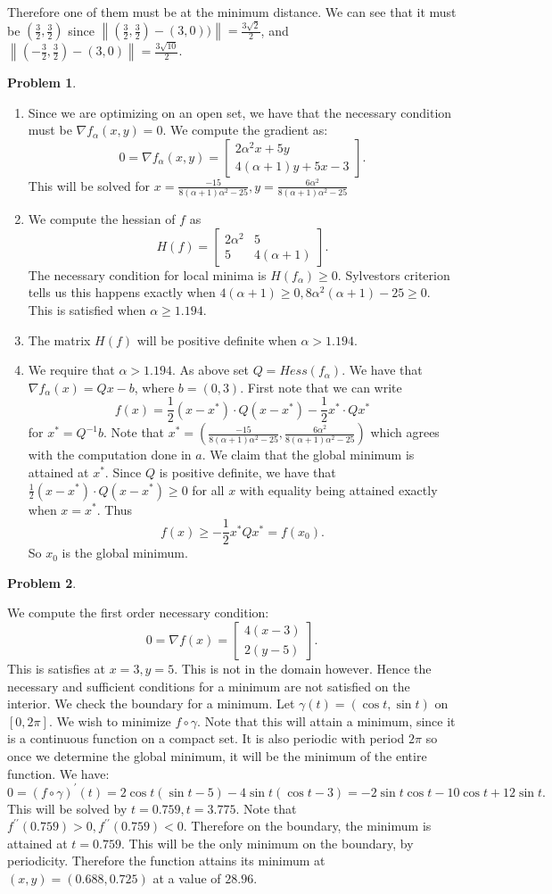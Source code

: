 \documentclass[12pt, a4paper]{article}
\newtheorem{problem}{Problem}
\theoremstyle{definition}
\newcommand{\penum}{ \begin{enumerate}[label=\bf(\alph*), leftmargin=0pt]}
\newcommand{\epenum}{ \end{enumerate} }
\newcommand{\grad}{\nabla}
\newcommand{\norm}[1]{\left\lVert#1\right\rVert}
\newcommand{\bmat}[1]{\begin{bmatrix}#1\end{bmatrix}}
\begin{document}
Therefore one of them must be at the minimum distance. We can see that it must be $(\frac{3}{2}, \frac{3}{2})$ since $\norm{(\frac{3}{2}, \frac{3}{2} )- (3,0))} = \frac{3\sqrt{2}}{2}$, and $\norm{(-\frac{3}{2}, \frac{3}{2}) - (3,0)} = \frac{3\sqrt{10}}{2}$. 
\newpage
\begin{problem}
\end{problem}
\penum 
\item Since we are optimizing on an open set, we have that the necessary condition must be $\grad f_\alpha(x,y) = 0$. We compute the gradient as: 
$$0 = \grad f_\alpha (x,y) = \bmat{2\alpha^2 x + 5y \\ 4(\alpha+1) y +5x -3}.$$
This will be solved for $x= \frac{-15}{8(\alpha+1)\alpha^2 -  25}, y= \frac{6\alpha^2}{8(\alpha+1)\alpha^2 - 25}$
\item We compute the hessian of $f$ as 
$$H(f) = \bmat{2\alpha^2 & 5 \\ 5 & 4(\alpha +1)}.$$
The necessary condition for local minima is $H(f_\alpha)\geq 0$. Sylvestors criterion tells us this happens exactly when $4(\alpha+1)\geq 0, 8\alpha^2(\alpha+1) - 25 \geq0$. This is satisfied when $\alpha \geq 1.194$. 
\item The matrix $H(f)$ will be positive definite when $\alpha> 1.194$. 
\item We require that $\alpha > 1.194$. As above set $Q = Hess(f_\alpha)$. We have that $\grad f_\alpha(x)  = Qx - b$, where $ b = (0,3)$. First note that we can write $$f(x) = \frac{1}{2} (x- x^\ast) \cdot Q (x-x^\ast) - \frac{1}{2} x^\ast \cdot Q x^\ast$$
for $x^\ast = Q^{-1}b$. Note that $x^\ast =( \frac{-15}{8(\alpha+1)\alpha^2 -  25},  \frac{6\alpha^2}{8(\alpha+1)\alpha^2 - 25} )$ which agrees with the computation done in $a$. We claim that the global minimum is attained at $x^\ast$. Since $Q$ is positive definite, we have that $\frac{1}{2} (x- x^\ast) \cdot Q (x-x^\ast) \geq 0$ for all $x$ with equality being attained exactly when $x = x^\ast$. Thus $$f(x) \geq - \frac{1}{2} x^\ast Q x^\ast = f(x_0). $$ So $x_0$ is the global minimum.
\epenum
\newpage
\begin{problem}
\end{problem}
We compute the first order necessary condition: 
$$0= \grad f(x) = \bmat{4(x-3) \\ 2(y-5)}.$$
This is satisfies at $x = 3,y=5$. This is not in the domain however. Hence the necessary and sufficient conditions for a minimum are not satisfied on the interior. We check the boundary for a minimum. Let $\gamma(t) = (\cos t, \sin t)$ on $[0,2\pi]$. We wish to minimize $f\circ \gamma$. Note that this will attain a minimum, since it is a continuous function on a compact set. It is also periodic with period $2\pi$ so once we determine the global minimum, it will be the minimum of the entire function. We have: 
$$0= (f\circ \gamma)^\prime (t)= 2\cos t(\sin t -5) - 4\sin t(\cos t - 3) =-2 \sin t \cos t - 10 \cos t + 12 \sin t.$$
This will be solved by $t = 0.759, t = 3.775$. Note that $f^{\prime \prime}(0.759) >0, f^{\prime \prime}(0.759)<0$. Therefore on the boundary, the minimum is attained at $t = 0.759$. This will be the only minimum on the boundary, by periodicity. Therefore the function attains its minimum at $(x,y) = (0.688,0.725)$ at a value of $28.96$. 
\end{document}

